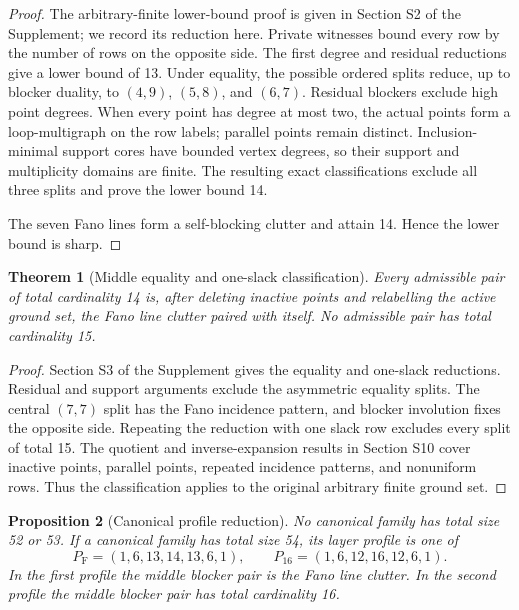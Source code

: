 \documentclass[11pt]{article}
\newtheorem{theorem}{Theorem}[section]
\newtheorem{proposition}[theorem]{Proposition}
\theoremstyle{definition}
\theoremstyle{remark}
\begin{document}
\begin{proof}
The arbitrary-finite lower-bound proof is given in Section S2 of the
Supplement; we record its reduction here.  Private witnesses bound every row
by the number of rows on the opposite side.  The first degree and residual
reductions give a lower bound of 13.  Under equality, the possible ordered
splits reduce, up to blocker duality, to $(4,9)$, $(5,8)$, and $(6,7)$.
Residual blockers exclude high point degrees.  When every point has degree at
most two, the actual points form a loop-multigraph on the row labels;
parallel points remain distinct.  Inclusion-minimal support cores have
bounded vertex degrees, so their support and multiplicity domains are finite.
The resulting exact classifications exclude all three splits and prove the
lower bound 14.

The seven Fano lines form a self-blocking clutter and attain 14.  Hence the
lower bound is sharp.
\end{proof}

\begin{theorem}[Middle equality and one-slack classification]
\label{thm:m33-classification-main}
Every admissible pair of total cardinality 14 is, after deleting inactive
points and relabelling the active ground set, the Fano line clutter paired
with itself.  No admissible pair has total cardinality 15.
\end{theorem}

\begin{proof}
Section S3 of the Supplement gives the equality and one-slack reductions.
Residual and support arguments exclude the asymmetric equality splits.  The
central $(7,7)$ split has the Fano incidence pattern, and blocker involution
fixes the opposite side.  Repeating the reduction with one slack row excludes
every split of total 15.  The quotient and inverse-expansion results in
Section S10 cover inactive points, parallel points, repeated incidence
patterns, and nonuniform rows.  Thus the classification applies to the
original arbitrary finite ground set.
\end{proof}

\begin{proposition}[Canonical profile reduction]
\label{prop:canonical-profiles}
No canonical family has total size 52 or 53.  If a canonical family has total
size 54, its layer profile is one of
\[
  P_{\mathrm F}=(1,6,13,14,13,6,1),\qquad
  P_{16}=(1,6,12,16,12,6,1).
\]
In the first profile the middle blocker pair is the Fano line clutter.  In the
second profile the middle blocker pair has total cardinality 16.
\end{proposition}
\end{document}
